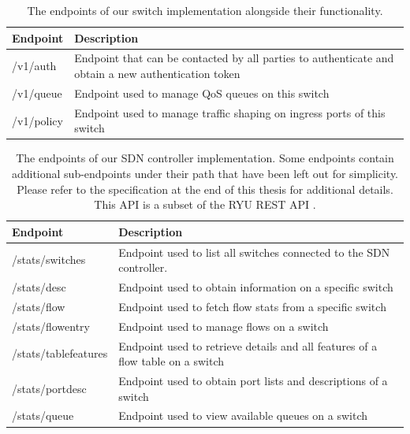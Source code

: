 \begin{table}[htp]
    \begin{tabularx}{\textwidth}{ |l|X| }
        \hline
        \textbf{Endpoint} & \textbf{Description} \\
        \hline
         /v1/auth & Endpoint that can be contacted by all parties to authenticate and obtain a new authentication token \\
        \hline
         /v1/queue & Endpoint used to manage QoS queues on this switch \\
         /v1/policy & Endpoint used to manage traffic shaping on ingress ports of this switch \\
        \hline
    \end{tabularx}
    \caption[Switch endpoints]{The endpoints of our switch implementation alongside their functionality.}
    \label{table:switch}
\end{table}

\begin{table}[htp]
    \begin{tabularx}{\textwidth}{ |l|X| }
        \hline
        \textbf{Endpoint} & \textbf{Description} \\
        \hline
         /stats/switches & Endpoint used to list all switches connected to the SDN controller. \\
         /stats/desc & Endpoint used to obtain information on a specific switch \\
        \hline
         /stats/flow & Endpoint used to fetch flow stats from a specific switch \\
         /stats/flowentry & Endpoint used to manage flows on a switch \\
         /stats/tablefeatures & Endpoint used to retrieve details and all features of a flow table on a switch \\
         /stats/portdesc & Endpoint used to obtain port lists and descriptions of a switch \\
         /stats/queue & Endpoint used to view available queues on a switch \\
        \hline
    \end{tabularx}
    \caption[Controller endpoints]{The endpoints of our SDN controller implementation. Some endpoints contain additional sub-endpoints under their path that have been left out for simplicity. Please refer to the specification at the end of this thesis for additional details. This API is a subset of the RYU REST API \cite{ryu-rest}.}
    \label{table:controller}
\end{table}

